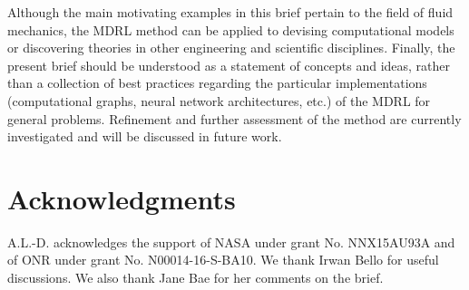 \documentclass{article}
\begin{document}
Although the main motivating examples in this brief pertain to the field of fluid mechanics, the MDRL method can be applied to devising computational models or discovering theories in other engineering and scientific disciplines. Finally, the present brief should be understood as a statement of concepts and ideas, rather than a collection of best practices regarding the particular implementations (computational graphs, neural network architectures, etc.) of the MDRL for general problems. Refinement and further assessment of the method are currently investigated and will be discussed in future work.

\section*{Acknowledgments}


A.L.-D. acknowledges the support of NASA under grant No. NNX15AU93A
and of ONR under grant No. N00014-16-S-BA10. We thank Irwan Bello for
useful discussions. We also thank Jane Bae for her comments on the
brief.


\end{document}
